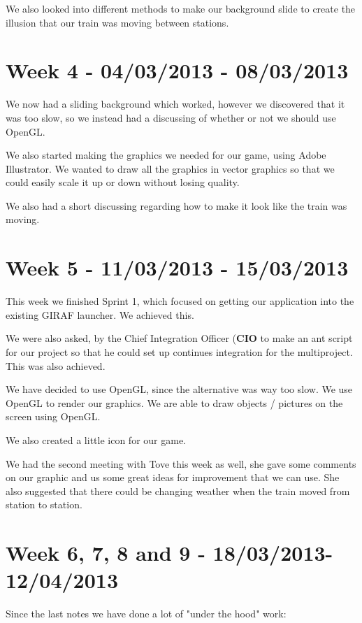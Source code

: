 We also looked into different methods to make our background slide to create the illusion that our train was moving between stations. 

\section*{Week 4 - 04/03/2013 - 08/03/2013}
We now had a sliding background which worked, however we discovered that it was too slow, so we instead had a discussing of whether or not we should use OpenGL. 

We also started making the graphics we needed for our game, using Adobe Illustrator. We wanted to draw all the graphics in vector graphics so that we could easily scale it up or down without losing quality. 

We also had a short discussing regarding how to make it look like the train was moving. 

\section*{Week 5 - 11/03/2013 - 15/03/2013}
This week we finished Sprint 1, which focused on getting our application into the existing GIRAF launcher. We achieved this. 

We were also asked, by the Chief Integration Officer (\textbf{CIO} to make an ant script for our project so that he could set up continues integration for the multiproject. This was also achieved. 

We have decided to use OpenGL, since the alternative was way too slow. We use OpenGL to render our graphics. We are able to draw objects / pictures on the screen using OpenGL. 

We also created a little icon for our game. 

We had the second meeting with Tove this week as well, she gave some comments on our graphic and us some great ideas for improvement that we can use. She also suggested that there could be changing weather when the train moved from station to station. 

\section*{Week 6, 7, 8 and 9 - 18/03/2013-12/04/2013}
Since the last notes we have done a lot of "under the hood" work:

